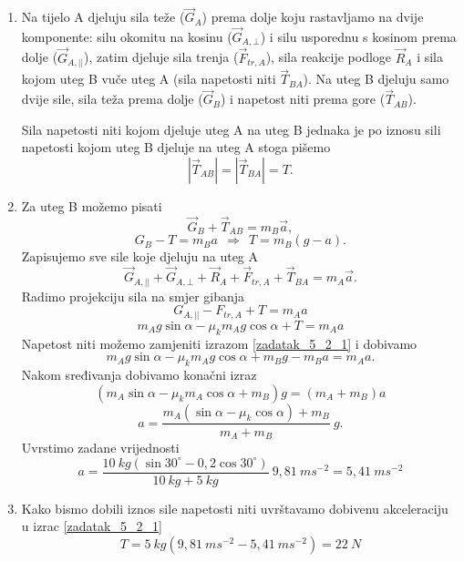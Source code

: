 

\begin{enumerate}[label=\alph*)]
\item Na tijelo A djeluju sila teže ($\vec{G}_A$) prema dolje koju rastavljamo na dvije komponente:
silu okomitu na kosinu ($ \vec{G}_{A,\bot}$) i silu usporednu s kosinom prema dolje ($\vec{G}_{A,||} $), zatim djeluje sila 
trenja ($\vec{F}_{tr,A} $), sila reakcije podloge $\vec{R}_A$ i sila kojom uteg B vuče uteg A (sila napetosti niti $\vec{T}_{BA} $).  
Na uteg B djeluju samo dvije sile, sila teža prema dolje ($\vec{G}_B$) i napetost niti prema gore ($\vec{T}_{AB}$).

Sila napetosti niti kojom djeluje uteg A na uteg B jednaka je po iznosu sili napetosti kojom uteg B djeluje na uteg A stoga pišemo
$$ |\vec{T}_{AB}|=|\vec{T}_{BA}|=T. $$ 
\item 
Za uteg B možemo pisati
$$\vec{G}_B+\vec{T}_{AB}=m_B\vec{a},$$
\begin{equation}
 G_B-T=m_Ba   \ \ \Rightarrow \ \  T=m_B(g-a).  
 \label{zadatak_5_2_1}
\end{equation}
Zapisujemo sve sile koje djeluju na uteg A
$$ \vec{G}_{A,||}+\vec{G}_{A,\bot}+\vec{R}_A+\vec{F}_{tr,A} + \vec{T}_{BA}=m_A\vec{a}.  $$
Radimo projekciju sila na smjer gibanja
$$ G_{A,||} -F_{tr,A}+T=m_A a  $$
$$ m_Ag\sin\alpha-\mu_k m_Ag\cos\alpha +T = m_Aa $$
Napetost niti možemo zamjeniti izrazom \ref{zadatak_5_2_1} i dobivamo
$$ m_Ag\sin\alpha-\mu_k m_Ag\cos\alpha +m_Bg-m_Ba = m_Aa. $$ 
Nakom sređivanja dobivamo konačni izraz
$$ (m_A\sin\alpha-\mu_k m_A\cos\alpha +m_B)g =( m_A+m_B)a $$
$$a=\frac{m_A(\sin\alpha-\mu_k \cos\alpha) +m_B}{ m_A+m_B}\ g. $$
Uvrstimo zadane vrijednosti
$$a=\frac{10\ kg(\sin30^\circ-0,2\cos30^\circ)}{10\ kg+5\ kg}\ 9,81\ ms^{-2}=5,41 \ ms^{-2}$$

 \item Kako bismo dobili iznos sile napetosti niti uvrštavamo dobivenu akceleraciju u izrac \ref{zadatak_5_2_1}
 $$ T=5\ kg(9,81 \ ms^{-2}- 5,41 \ ms^{-2})=22\ N $$
 
 
\end{enumerate}


